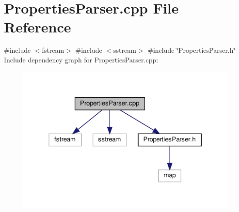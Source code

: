 \section{Properties\+Parser.\+cpp File Reference}
\label{_properties_parser_8cpp}
{\ttfamily \#include $<$fstream$>$}\newline
{\ttfamily \#include $<$sstream$>$}\newline
{\ttfamily \#include \char`\"{}Properties\+Parser.\+h\char`\"{}}\newline
Include dependency graph for Properties\+Parser.\+cpp\+:
\nopagebreak
\begin{figure}[H]
\begin{center}
\leavevmode
\includegraphics[width=316pt]{_properties_parser_8cpp__incl}
\end{center}
\end{figure}
